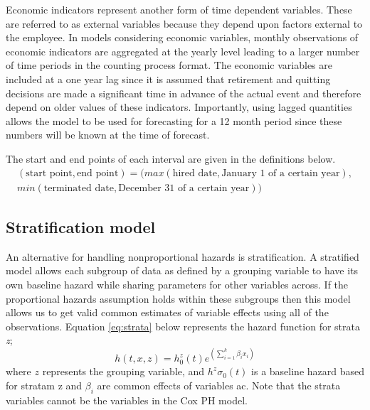 \documentclass[12pt,letterpaper]{article}
\begin{document}
Economic indicators represent another form of time dependent variables.  These are referred to as external variables because they depend upon factors external to the employee.  In models considering economic variables, monthly observations of economic indicators are aggregated at the yearly level leading to a larger number of time periods in the counting process format.  The economic variables are included at a one year lag since it is assumed that retirement and quitting decisions are made a significant time in advance of the actual event and therefore depend on older values of these indicators.  Importantly, using lagged quantities allows the model to be used for forecasting for a 12 month period since these numbers will be known at the time of forecast.

The start and end points of each interval are given in the definitions below.
\begin{equation}
	\label{eq:interval}
	\begin{split}
		(\text{start point}, \text{end point})= (max(\text{hired date}, \text{January 1 of a certain year}),\\
		min(\text{terminated date}, \text{December 31 of a certain year}))
	\end{split}
\end{equation}



\subsection{Stratification model}
An alternative for handling nonproportional hazards is stratification.  A stratified model allows each subgroup of data as defined by a grouping variable to have its own baseline hazard while sharing parameters for other variables across. If the proportional hazards assumption holds within these subgroups then this model allows us to get valid common estimates of variable effects using all of the observations. Equation \ref{eq:strata} below represents the hazard function for strata {\it z};
\begin{equation}
	\label{eq:strata}
	h(t,x,z)=h^z_0(t)e^{(\sum_{i=1}^{k}\beta_ix_i)}
\end{equation}
where $z$ represents the grouping variable, and $h^z\sigma_0(t)$ is a baseline hazard based for stratam z and $\beta_i$ are common effects of variables ac. Note that the strata variables cannot be the variables in the Cox PH model.
\end{document}
